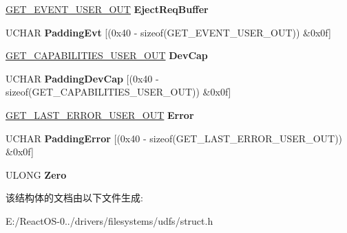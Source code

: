 \begin{DoxyCompactItemize}
\hyperlink{union___g_e_t___e_v_e_n_t___u_s_e_r___o_u_t}{G\+E\+T\+\_\+\+E\+V\+E\+N\+T\+\_\+\+U\+S\+E\+R\+\_\+\+O\+UT} {\bfseries Eject\+Req\+Buffer}
\item 
\mbox{\label{struct___u_d_f_eject_wait_context_a4f5b90c928a8abc6343f88664bec33fa}} 
U\+C\+H\+AR {\bfseries Padding\+Evt} \mbox{[}(0x40 -\/ sizeof(\+G\+E\+T\+\_\+\+E\+V\+E\+N\+T\+\_\+\+U\+S\+E\+R\+\_\+\+O\+U\+T)) \&0x0f\mbox{]}
\item 
\mbox{\label{struct___u_d_f_eject_wait_context_ad5961824e3fa24986774b44360630ce7}} 
\hyperlink{struct___g_e_t___c_a_p_a_b_i_l_i_t_i_e_s___u_s_e_r___o_u_t}{G\+E\+T\+\_\+\+C\+A\+P\+A\+B\+I\+L\+I\+T\+I\+E\+S\+\_\+\+U\+S\+E\+R\+\_\+\+O\+UT} {\bfseries Dev\+Cap}
\item 
\mbox{\label{struct___u_d_f_eject_wait_context_a8bce8c31e215ccc5d27cacbb9c2a99cb}} 
U\+C\+H\+AR {\bfseries Padding\+Dev\+Cap} \mbox{[}(0x40 -\/ sizeof(\+G\+E\+T\+\_\+\+C\+A\+P\+A\+B\+I\+L\+I\+T\+I\+E\+S\+\_\+\+U\+S\+E\+R\+\_\+\+O\+U\+T)) \&0x0f\mbox{]}
\item 
\mbox{\label{struct___u_d_f_eject_wait_context_afbf65bc569cb008df7816b20d05602de}} 
\hyperlink{struct___g_e_t___l_a_s_t___e_r_r_o_r___u_s_e_r___o_u_t}{G\+E\+T\+\_\+\+L\+A\+S\+T\+\_\+\+E\+R\+R\+O\+R\+\_\+\+U\+S\+E\+R\+\_\+\+O\+UT} {\bfseries Error}
\item 
\mbox{\label{struct___u_d_f_eject_wait_context_ae02a488e5ca537e8d1dbd18465001fb3}} 
U\+C\+H\+AR {\bfseries Padding\+Error} \mbox{[}(0x40 -\/ sizeof(\+G\+E\+T\+\_\+\+L\+A\+S\+T\+\_\+\+E\+R\+R\+O\+R\+\_\+\+U\+S\+E\+R\+\_\+\+O\+U\+T)) \&0x0f\mbox{]}
\item 
\mbox{\label{struct___u_d_f_eject_wait_context_a2183ca9008a01a79ea5f4dece523b5e9}} 
U\+L\+O\+NG {\bfseries Zero}
\end{DoxyCompactItemize}


该结构体的文档由以下文件生成\+:\begin{DoxyCompactItemize}
\item 
E\+:/\+React\+O\+S-\/0../drivers/filesystems/udfs/struct.\+h\end{DoxyCompactItemize}
